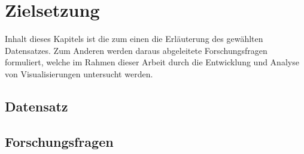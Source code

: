 \chapter[Zielsetzung]{Zielsetzung}

Inhalt dieses Kapitels ist die zum einen die Erläuterung des gewählten Datensatzes.
Zum Anderen werden daraus abgeleitete Forschungsfragen formuliert, welche im Rahmen dieser Arbeit durch die Entwicklung und Analyse von Visualisierungen untersucht werden. 

\section[Untersuchter Datensatz]{Datensatz}

\section[Forschungsfragen]{Forschungsfragen}